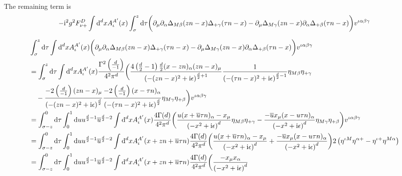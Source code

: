 The remaining term is 
\begin{align}
	-\text{i}^2 g^2 F_{\nu +} ^D\int \text{d} ^d x A_\iota^{A'}(x) \int ^z_\sigma \text{d} \tau \bigg( \partial_\mu \partial_\alpha \Delta_{M\beta}(zn-x) \Delta_{+\gamma} (\tau n - x) - \partial_\mu \Delta_{M\gamma}(zn-x) \partial_\alpha\Delta_{+\beta}(\tau n -x)\bigg)  v^{\iota \alpha\beta\gamma}
\end{align}

\begin{align}
	&\int_\sigma^z \dx \tau\int \ddx x  A_\iota^{A'}(x) \bigg( \partial_\mu \partial_\alpha \propagator_{M\beta}(zn-x) \propagator_{+\gamma} (\tau n - x) - \partial_\mu \propagator_{M\gamma}(zn-x) \partial_\alpha\propagator_{+\beta}(\tau n -x)\bigg)  v^{\iota \alpha\beta\gamma}
	\\
	&=
	\int_\sigma^z \dx \tau\int \ddx x  A_\iota^{A'}(x) \frac{\Gamma^2\left(\frac{d}{-1}\right)}{4^2\pi^{d}}\bigg( \frac{4\left(\frac{d}{2}-1\right)\frac{d}{2}(x-zn)_\alpha (zn-x)_\mu}{\left(-(zn-x)^2+\imag \epsilon\right)^{\frac{d}{2}+1}}\frac{1}{\left(-(\tau n-x)^2+\imag \epsilon\right)^{\frac{d}{2}-1}}\metric_{M\beta}\metric_{+\gamma} 
	\nl
	- \frac{-2\left(\frac{d}{-1}\right)(zn-x)_\mu}{\left(-(zn-x)^2+\imag \epsilon\right)^{\frac{d}{2}}}\frac{-2\left(\frac{d}{-1}\right)(x- \tau n)_\alpha}{\left(-(\tau n-x)^2+\imag \epsilon\right)^{\frac{d}{2}}}\metric_{M\gamma}\metric_{+\beta}\bigg)  v^{\iota \alpha\beta\gamma}
	\\
	&=
	\int^{0}_{\sigma-z} \dx \tau\int _0^1 \dx u u^{\frac{d}{2}-1} \overline u ^{\frac{d}{2}-2} \int \ddx x  A_\iota^{A'}(x) \frac{4\Gamma(d)}{4^2\pi^{d}}\bigg( \frac{u(x+ \overline u \tau n)_\alpha-x_\mu}{\left(-x^2+\imag \epsilon\right)^{d}}\metric_{M\beta}\metric_{+\gamma} 
	-\frac{-\overline u x_\mu(x - u \tau n)_\alpha}{\left(-x^2+\imag \epsilon\right)^{d}}\metric_{M\gamma}\metric_{+\beta}\bigg)  v^{\iota \alpha\beta\gamma}
	\\
	&=
	\int^{0}_{\sigma-z} \dx \tau\int _0^1 \dx u u^{\frac{d}{2}-1} \overline u ^{\frac{d}{2}-2} \int \ddx x  A_\iota^{A'}(x+z n + \overline u \tau n) \frac{4\Gamma(d)}{4^2\pi^{d}}\bigg( \frac{u(x+ \overline  u \tau n)_\alpha-x_\mu}{\left(-x^2+\imag \epsilon\right)^{d}} 
	+\frac{-\overline u x_\mu(x -  u \tau n)_\alpha}{\left(-x^2+\imag \epsilon\right)^{d}}\bigg)  2\left(\metric^{\iota M } \metric^{\alpha +}  - \metric^{\iota +} \metric^{M\alpha} \right)
	\\
	&=
	\int^{0}_{\sigma-z} \dx \tau\int _0^1 \dx u u^{\frac{d}{2}-1} \overline u ^{\frac{d}{2}-2}\int \ddx x  A_\iota^{A'}(x+z n + \overline u \tau n) \frac{4\Gamma(d)}{4^2\pi^{d}}\bigg( \frac{ -x_\mu x_\alpha}{\left(-x^2+\imag \epsilon\right)^{d}} 

\end{align}
